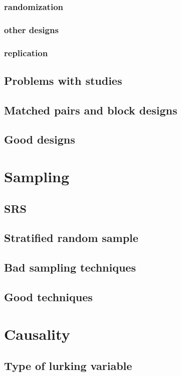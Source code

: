 \subsubsection{randomization}
\subsubsection{other designs}
\subsubsection{replication}

\subsection{Problems with studies}  %
\subsection{Matched pairs and block designs}  %
\subsection{Good designs}  %

\section{Sampling}  %
\subsection{SRS}  %
\subsection{Stratified random sample}  %
\subsection{Bad sampling techniques}  %
\subsection{Good techniques}  %

\section{Causality}  %
\subsection{Type of lurking variable}  %
